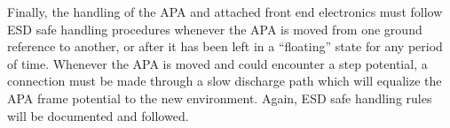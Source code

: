 Finally, the handling of the APA and attached front end electronics must follow ESD safe handling procedures whenever the APA is moved from one ground reference to another, or after it has been left in a ``floating'' state for any period of time.  Whenever the APA is moved and could encounter a step potential, a connection must be made through a slow discharge path which will equalize the APA frame potential to the new environment.  Again, ESD safe handling rules will be documented and followed.
